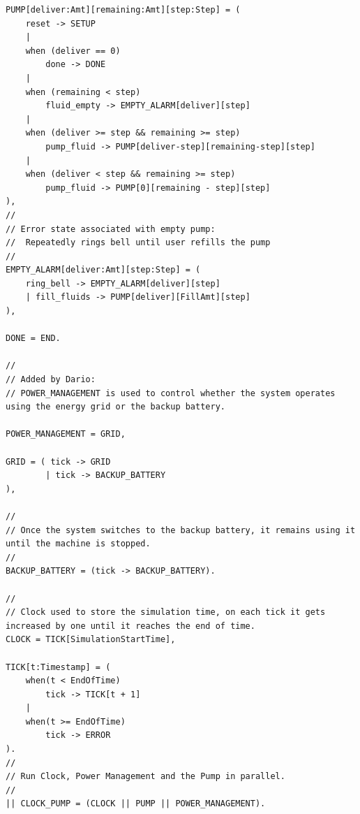 \documentclass{article}
\begin{document}
\begin{verbatim}
PUMP[deliver:Amt][remaining:Amt][step:Step] = (
    reset -> SETUP
    |
    when (deliver == 0)
        done -> DONE 
    |
    when (remaining < step)
        fluid_empty -> EMPTY_ALARM[deliver][step]
    |
    when (deliver >= step && remaining >= step)
        pump_fluid -> PUMP[deliver-step][remaining-step][step]
    |
    when (deliver < step && remaining >= step)
        pump_fluid -> PUMP[0][remaining - step][step]
),
//
// Error state associated with empty pump:
//  Repeatedly rings bell until user refills the pump
//
EMPTY_ALARM[deliver:Amt][step:Step] = (
    ring_bell -> EMPTY_ALARM[deliver][step]
    | fill_fluids -> PUMP[deliver][FillAmt][step]
),

DONE = END.

//
// Added by Dario:
// POWER_MANAGEMENT is used to control whether the system operates using the energy grid or the backup battery.

POWER_MANAGEMENT = GRID,

GRID = ( tick -> GRID
        | tick -> BACKUP_BATTERY
),

//
// Once the system switches to the backup battery, it remains using it until the machine is stopped.
//
BACKUP_BATTERY = (tick -> BACKUP_BATTERY).

//
// Clock used to store the simulation time, on each tick it gets increased by one until it reaches the end of time.
CLOCK = TICK[SimulationStartTime],

TICK[t:Timestamp] = (
    when(t < EndOfTime)
        tick -> TICK[t + 1]
    |
    when(t >= EndOfTime)
        tick -> ERROR
).
//
// Run Clock, Power Management and the Pump in parallel.
//
|| CLOCK_PUMP = (CLOCK || PUMP || POWER_MANAGEMENT).

\end{verbatim}
\end{document}
